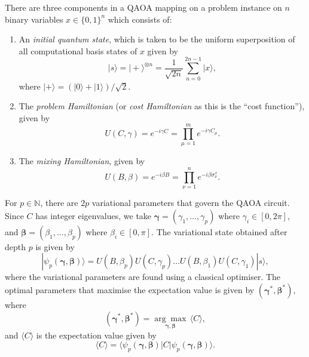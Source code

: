     There are three components in a QAOA mapping on a problem instance on $n$ binary variables $x\in\{0,1\}^n$ which consists of:
    \begin{enumerate}
        \item An \emph{initial quantum state}, which is taken to be the uniform superposition of all computational basis states of $x$ given by 
        \begin{equation}
            |s\rangle =|+\rangle ^{\otimes n} = \frac{1}{\sqrt{2n}}\sum^{2n-1}_{n=0}|x\rangle,
        \end{equation}
        where $|+\rangle = (|0\rangle+|1\rangle)/\sqrt{2}$.
        \item The \emph{problem Hamiltonian} (or \emph{cost Hamiltonian} as this is the ``cost function''), given by 
        \begin{equation}
            U(C,\gamma) = e^{-i\gamma C} = \prod^m_{\mu=1}e^{-i\gamma C_\mu}.
        \end{equation}
        \item The \emph{mixing Hamiltonian}, given by 
        \begin{equation}
            U(B,\beta) = e^{-i\beta B} = \prod^n_{\nu=1} e^{-i\beta \sigma^x_\nu}.
        \end{equation}
    \end{enumerate}
    For $p\in \mathbb{N}$, there are $2p$ variational parameters that govern the QAOA circuit. Since $C$ has integer eigenvalues, we take $\pmb{\gamma} =(\gamma_1,\dots,\gamma_p)$ where $\gamma_i\in[0,2\pi]$, and $\pmb{\beta} = (\beta_1,\dots,\beta_p)$ where $\beta_i\in[0,\pi]$. The variational state obtained after depth $p$ is given by 
    \begin{equation}
        |\psi_p(\pmb{\gamma},\pmb{\beta})\rangle = U(B,\beta_p)U(C,\gamma_p)\dots U(B,\beta_1)U(C,\gamma_1)|s\rangle,
    \end{equation}
    where the variational parameters are found using a classical optimiser. The optimal parameters that maximise the expectation value is given by $(\pmb{\gamma^*},\pmb{\beta^*})$, where
    \begin{equation}
        (\pmb{\gamma^*},\pmb{\beta^*}) = \underset{\pmb{\gamma},\pmb{\beta}}{\arg\max}\, \langle C\rangle,
    \end{equation}
    and $\langle C\rangle$ is the expectation value given by 
    \begin{equation}
        \langle C \rangle = \langle \psi_p (\pmb{\gamma},\pmb{\beta})| C |\psi_p(\pmb{\gamma},\pmb{\beta})\rangle .
    \end{equation}

